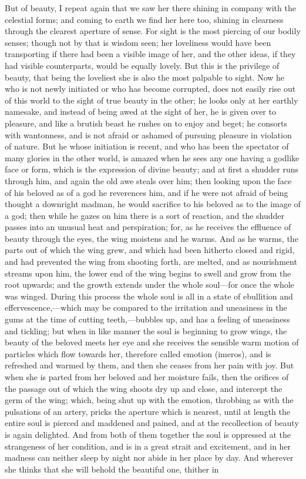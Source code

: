 \documentclass[11pt,letter]{article}
\begin{document}
\par  But of beauty, I repeat again that we saw her there shining in company with the celestial forms; and coming to earth we find her here too, shining in clearness through the clearest aperture of sense. For sight is the most piercing of our bodily senses; though not by that is wisdom seen; her loveliness would have been transporting if there had been a visible image of her, and the other ideas, if they had visible counterparts, would be equally lovely. But this is the privilege of beauty, that being the loveliest she is also the most palpable to sight. Now he who is not newly initiated or who has become corrupted, does not easily rise out of this world to the sight of true beauty in the other; he looks only at her earthly namesake, and instead of being awed at the sight of her, he is given over to pleasure, and like a brutish beast he rushes on to enjoy and beget; he consorts with wantonness, and is not afraid or ashamed of pursuing pleasure in violation of nature. But he whose initiation is recent, and who has been the spectator of many glories in the other world, is amazed when he sees any one having a godlike face or form, which is the expression of divine beauty; and at first a shudder runs through him, and again the old awe steals over him; then looking upon the face of his beloved as of a god he reverences him, and if he were not afraid of being thought a downright madman, he would sacrifice to his beloved as to the image of a god; then while he gazes on him there is a sort of reaction, and the shudder passes into an unusual heat and perspiration; for, as he receives the effluence of beauty through the eyes, the wing moistens and he warms. And as he warms, the parts out of which the wing grew, and which had been hitherto closed and rigid, and had prevented the wing from shooting forth, are melted, and as nourishment streams upon him, the lower end of the wing begins to swell and grow from the root upwards; and the growth extends under the whole soul—for once the whole was winged. During this process the whole soul is all in a state of ebullition and effervescence,—which may be compared to the irritation and uneasiness in the gums at the time of cutting teeth,—bubbles up, and has a feeling of uneasiness and tickling; but when in like manner the soul is beginning to grow wings, the beauty of the beloved meets her eye and she receives the sensible warm motion of particles which flow towards her, therefore called emotion (imeros), and is refreshed and warmed by them, and then she ceases from her pain with joy. But when she is parted from her beloved and her moisture fails, then the orifices of the passage out of which the wing shoots dry up and close, and intercept the germ of the wing; which, being shut up with the emotion, throbbing as with the pulsations of an artery, pricks the aperture which is nearest, until at length the entire soul is pierced and maddened and pained, and at the recollection of beauty is again delighted. And from both of them together the soul is oppressed at the strangeness of her condition, and is in a great strait and excitement, and in her madness can neither sleep by night nor abide in her place by day. And wherever she thinks that she will behold the beautiful one, thither in 
\end{document}
